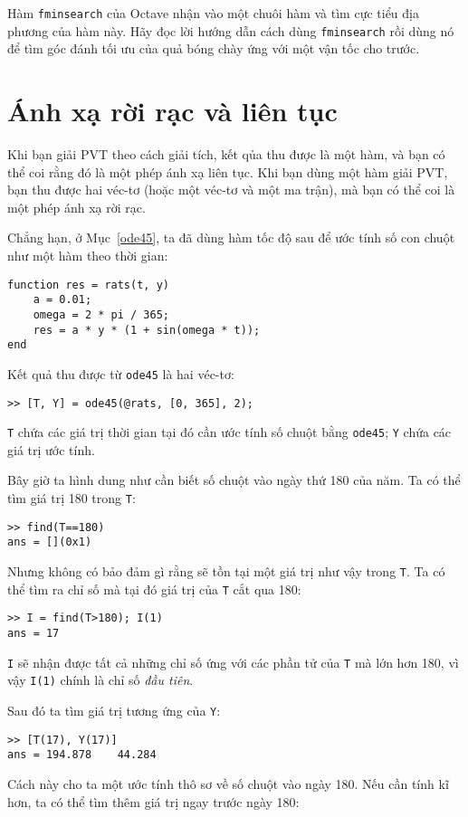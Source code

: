 \documentclass[12pt]{book}
\begin{document}
\begin{ex}
Hàm {\tt fminsearch} của Octave nhận vào một chuôi hàm và tìm 
cực tiểu địa phương của hàm này. Hãy đọc lời hướng dẫn cách dùng  
{\tt fminsearch} rồi dùng nó để tìm góc đánh tối ưu của quả bóng 
chày ứng với một  vận tốc cho trước. 
\end{ex}


\section{Ánh xạ rời rạc và liên tục }

Khi bạn giải PVT theo cách giải tích, kết qủa thu được là một hàm, 
và bạn có thể coi rằng đó là một phép ánh xạ liên tục. Khi bạn 
dùng một hàm giải PVT, bạn thu được hai véc-tơ (hoặc một véc-tơ 
và một ma trận), mà bạn có thể coi là một phép ánh xạ rời rạc.

Chẳng hạn, ở Mục~\ref{ode45}, ta đã dùng hàm tốc độ sau để 
ước tính số con chuột như một hàm theo thời gian: 

\begin{verbatim}
function res = rats(t, y)
    a = 0.01;
    omega = 2 * pi / 365;
    res = a * y * (1 + sin(omega * t));
end
\end{verbatim}
%
Kết quả thu được từ  {\tt ode45} là hai véc-tơ:

\begin{verbatim}
>> [T, Y] = ode45(@rats, [0, 365], 2);
\end{verbatim}
%
{\tt T} chứa các giá trị thời gian tại đó cần ước tính số chuột bằng {\tt ode45}; 
{\tt Y} chứa các giá trị ước tính.

Bây giờ ta hình dung như cần biết số chuột vào ngày thứ 180 của năm. Ta có thể 
tìm giá trị 180 trong  {\tt T}:

\begin{verbatim}
>> find(T==180)
ans = [](0x1)
\end{verbatim}
%
Nhưng không có bảo đảm gì rằng sẽ tồn tại một giá trị như vậy trong {\tt T}.  
Ta có thể tìm ra chỉ số mà tại đó giá trị của {\tt T} cắt qua 180:

\begin{verbatim}
>> I = find(T>180); I(1)
ans = 17
\end{verbatim}
%
{\tt I} sẽ nhận được tất cả những  chỉ số ứng với các phần tử của  {\tt T} mà lớn 
hơn  180, vì vậy  {\tt I(1)} chính là chỉ số  {\em đầu tiên}.

Sau đó ta tìm giá trị tương ứng của  {\tt Y}:

\begin{verbatim}
>> [T(17), Y(17)]
ans = 194.878    44.284
\end{verbatim}
%   
Cách này cho ta một ước tính thô sơ về số chuột vào ngày 180. Nếu cần 
tính kĩ hơn, ta có thể tìm thêm giá trị ngay trước ngày 180:
\end{document}

